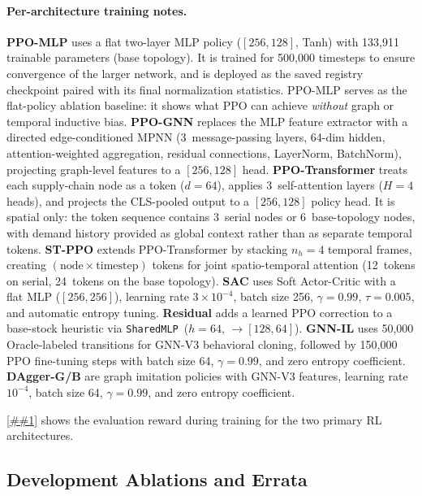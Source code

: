 \documentclass[10pt,a4paper]{article}
\providecommand{\Cref}[1]{\ref{##1}}
\begin{document}
\paragraph{Per-architecture training notes.}
\textbf{PPO-MLP} uses a flat two-layer MLP policy ($[256, 128]$, Tanh)
with 133{,}911 trainable parameters (base topology). It is trained for
500{,}000 timesteps to ensure convergence of the larger network, and is
deployed as the saved registry checkpoint paired with its final
normalization statistics. PPO-MLP serves as the flat-policy ablation
baseline: it shows what PPO can achieve \emph{without} graph or temporal
inductive bias.
\textbf{PPO-GNN} replaces the MLP feature extractor with a directed
edge-conditioned MPNN (3~message-passing layers, 64-dim hidden,
attention-weighted aggregation, residual connections, LayerNorm,
BatchNorm), projecting graph-level features to a $[256, 128]$ head.
\textbf{PPO-Transformer} treats each supply-chain node as a token
($d{=}64$), applies 3~self-attention layers ($H{=}4$ heads), and
projects the CLS-pooled output to a $[256, 128]$ policy head.
It is spatial only: the token sequence contains 3~serial nodes or
6~base-topology nodes, with demand history provided as global context
rather than as separate temporal tokens.
\textbf{ST-PPO} extends PPO-Transformer by stacking $n_h{=}4$
temporal frames, creating $(\text{node} \times \text{timestep})$
tokens for joint spatio-temporal attention (12~tokens on serial,
24~tokens on the base topology).
\textbf{SAC} uses Soft Actor-Critic with a flat MLP ($[256, 256]$),
learning rate $3{\times}10^{-4}$, batch size 256, $\gamma=0.99$,
$\tau=0.005$, and automatic entropy tuning.
\textbf{Residual} adds a learned PPO correction to a base-stock
heuristic via \texttt{SharedMLP}~($h{=}64$, $\to [128, 64]$).
\textbf{GNN-IL} uses 50{,}000 Oracle-labeled transitions for GNN-V3
behavioral cloning, followed by 150{,}000 PPO fine-tuning steps with
batch size 64, $\gamma=0.99$, and zero entropy coefficient.
\textbf{DAgger-G/B} are graph imitation policies with
GNN-V3 features, learning rate $10^{-4}$, batch size 64,
$\gamma=0.99$, and zero entropy coefficient.

\Cref{fig:training_curves} shows the evaluation reward during
training for the two primary RL architectures.

\subsection{Development Ablations and Errata}%
\label{sec:ablations}
\end{document}
